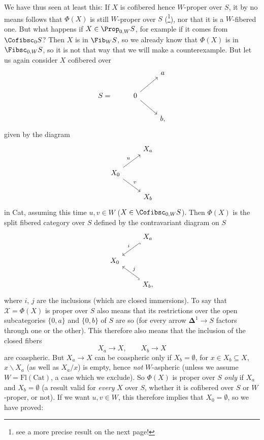 \margbar We have thus seen at least this: If $X$ is cofibered hence $W$-proper over $S$, it by no means follows that $\Phi(X)$ is still $W$-proper over $S$ (\footnote{see a more precise result on the next page!}), nor that it is a $W$-fibered one. But what happens if $X \in \Prop_{0,W}S$, for example if it comes from $\Cofibsc_0 S$? Then $X$ is in $\Fib_W S$, so we already know that $\Phi(X)$ is in $\Fibsc_{0,W}S$, so it is not that way that we will make a counterexample. But let us again consider $X$ cofibered over
\[
\begin{tikzcd}
 & & a \\
S = & 0 \arrow[ur] \arrow[dr] & \\
 & & b,
\end{tikzcd}
\]
given by the diagram
\[
\begin{tikzcd}
 & X_a \\
X_0 \arrow[ur, "u"] \arrow[dr, "v"] & \\
 & X_b
\end{tikzcd}
\]
in Cat, assuming this time $u, v \in W$ ($X \in \Cofibsc_{0,W}S$). Then $\Phi(X)$ is the split fibered category over $S$ defined by the contravariant diagram on $S$
\[
\begin{tikzcd}
 & X_a \arrow[dl, hook, "i"'] \\
X_0 & \\
 & X_b, \arrow[ul, hook, "j"']
\end{tikzcd}
\]
where $i$, $j$ are the inclusions (which are closed immersions). To say that $\mathcal{X} = \Phi(X)$ is proper over $S$ also means that its restrictions over the open subcategories $\{0,a\}$ and $\{0,b\}$ of $S$ are so (for every arrow $\mathbf{\Delta}^1 \longrightarrow S$ factors through one or the other). This
therefore also means that the inclusion of the closed fibers
\[ X_a \longrightarrow X, \qquad X_b \longrightarrow X \]
are coaspheric. But $X_a \longrightarrow X$ can be coaspheric only if $X_b = \emptyset$, for $x \in X_b \subseteq X$, $x\backslash X_a$ (as well as $X_a/x$) is empty, hence \textit{not} $W$-aspheric (unless we assume $W = \mathrm{Fl}(\mathrm{Cat})$, a case which we exclude). So $\Phi(X)$ is proper over $S$ \textit{only} if $X_a$ and $X_b = \emptyset$ (a result valid for \textit{every} $X$ over $S$, whether it is cofibered over $S$ or $W$-proper, or not). If we want $u, v \in W$, this therefore implies that $X_0 = \emptyset$, so we have proved: